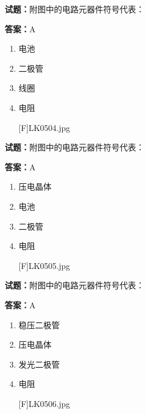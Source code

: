 \documentclass{ctexbook}
\begin{document}




\vspace{1em}

\textbf{试题：}附图中的电路元器件符号代表： 

\textbf{答案：}A 

\begin{enumerate}[leftmargin=3em]
  \item 电池 

  \item 二极管 

  \item 线圈 

  \item 电阻 

[F]LK0504.jpg 

\end{enumerate}





\vspace{1em}

\textbf{试题：}附图中的电路元器件符号代表： 

\textbf{答案：}A 

\begin{enumerate}[leftmargin=3em]
  \item 压电晶体 

  \item 电池 

  \item 二极管 


  \item 电阻 

[F]LK0505.jpg 

\end{enumerate}





\vspace{1em}

\textbf{试题：}附图中的电路元器件符号代表： 

\textbf{答案：}A 

\begin{enumerate}[leftmargin=3em]
  \item 稳压二极管 

  \item 压电晶体 

  \item 发光二极管 

  \item 电阻 

[F]LK0506.jpg 

\end{enumerate}
\end{document}
